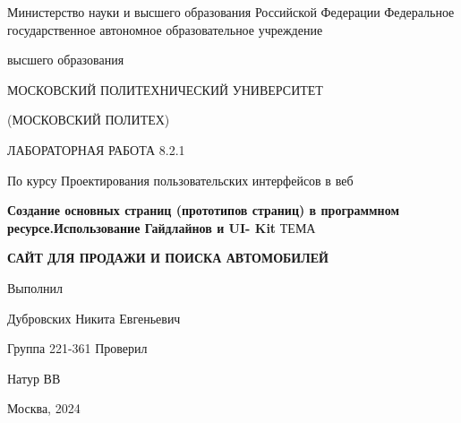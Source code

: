 \singlespacing

\newpage
\begin{center}
    Министерство науки и высшего образования Российской Федерации
    Федеральное государственное автономное образовательное учреждение

    высшего образования

    \guillemotleft МОСКОВСКИЙ ПОЛИТЕХНИЧЕСКИЙ УНИВЕРСИТЕТ\guillemotright

    (МОСКОВСКИЙ ПОЛИТЕХ)
\end{center}
\noindent
\bigbreak
\bigbreak
\bigbreak
\bigbreak
\begin{center}
    ЛАБОРАТОРНАЯ РАБОТА 8.2.1

    По курсу Проектирования пользовательских интерфейсов в веб

    \textbf{Создание основных страниц (прототипов страниц) в программном ресурсе.Использование Гайдлайнов и UI- Kit}
    \bigbreak
    \bigbreak
    \bigbreak
    \bigbreak
    ТЕМА

    \guillemotleft\textbf{САЙТ ДЛЯ ПРОДАЖИ И ПОИСКА АВТОМОБИЛЕЙ}\guillemotright
\end{center}
\noindent
\bigbreak
\bigbreak
\bigbreak
\bigbreak
\bigbreak
\bigbreak
\bigbreak
\bigbreak
\bigbreak
\bigbreak
\hfill Выполнил

\hfill Дубровских Никита Евгеньевич

\hfill Группа 221-361
\bigbreak
\bigbreak
\bigbreak
\hfill Проверил

\hfill Натур ВВ
\vfill
\begin{center}
    Москва, 2024
\end{center}
\newpage
\onehalfspacing
